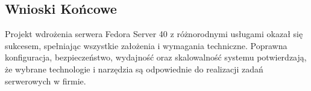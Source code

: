 \documentclass[a4paper]{article}
\begin{document}
\subsection{Wnioski Końcowe}
Projekt wdrożenia serwera Fedora Server 40 z różnorodnymi usługami okazał się sukcesem, spełniając wszystkie założenia i wymagania techniczne. Poprawna konfiguracja, bezpieczeństwo, wydajność oraz skalowalność systemu potwierdzają, że wybrane technologie i narzędzia są odpowiednie do realizacji zadań serwerowych w firmie.
\newpage
\nocite{fedora_docs}
\nocite{fedora_pl}
\nocite{linux_mint}
\nocite{ssh_wiki}
\nocite{dns_wiki}
\nocite{dhcp_wiki}
\nocite{dhcp_itwiz}
\nocite{raid_ideal}
\nocite{raid_wiki}
\nocite{mdadm_wiki}
\nocite{samba_wiki}
\nocite{apache_wiki}
\nocite{php_wiki}
\nocite{mysql_wiki}
\nocite{wordpress_wiki}
\nocite{wordpress_fedora}
\nocite{git_docs}
\nocite{wordpress_idroot}
\nocite{postfix_wiki}
\nocite{dovecot_wiki}
\nocite{squid_wiki}
\nocite{proxy_baeldung}
\nocite{ftp_wiki}
\nocite{ftp_server_world}
\nocite{kozienski_it}

\printbibliography[heading=bibnumbered, label=Literatura, title=Literatura]
\end{document}
